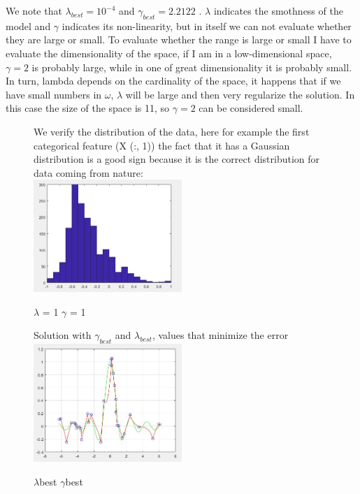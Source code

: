 We note that $\lambda_{best} = 10^{-4}$ and $\gamma_{best} = 2.2122$
. $\lambda$ indicates the smothness of the model and $\gamma$ indicates its non-linearity, but in itself we can not evaluate whether they are large or small.
To evaluate whether the range is large or small I have to evaluate the dimensionality of the space, if I am in a low-dimensional space, $\gamma = 2$ is probably large, while in one of great dimensionality it is probably small. In turn, lambda depends on the cardinality of the space, it happens that if we have small numbers in $\omega$, $\lambda$ will be large and then very regularize the solution.
In this case the size of the space is 11, so $\gamma = 2$ can be considered small.\\
\begin{figure}
We verify the distribution of the data, here for example the first categorical feature (X (:, 1)) the fact that it has a Gaussian distribution is a good sign because it is the correct distribution for data coming from nature:\\
	
	\includegraphics[width=0.5\textwidth]{hist1.png}
	\centering
	\caption{$\lambda$ = 1 $\gamma$ = 1}
	\label{fig:\lambda = 1 \gamma = 1}

	
\end{figure}

\begin{figure}

Solution with $\gamma_{best}$ and $\lambda_{best}$, values that minimize the error\\

	\includegraphics[width=0.5\textwidth]{kmlbgb.png}
	\centering
	\caption{$\lambda$best $\gamma$best}
	
	
\end{figure}

